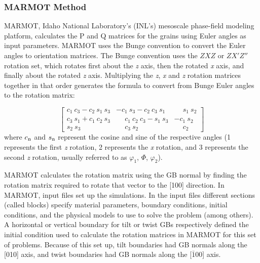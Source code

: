 \documentclass[twoside,senior]{BYUPhys}
\begin{document}
\subsubsection{MARMOT Method\label{PQ:MARMOT}}
MARMOT, Idaho National Laboratory's (INL's) mesoscale phase-field modeling platform,\cite{tonks2012} calculates the P and Q matrices for the grains using Euler angles as input parameters.  MARMOT uses the Bunge convention to convert the Euler angles to orientation matrices.  The Bunge convention uses the $ZXZ$ or $ZX'Z''$ rotation set, which rotates first about the \emph{z} axis, then the rotated \emph{x} axis, and finally about the rotated \emph{z} axis.  Multiplying the \emph{z}, \emph{x} and \emph{z} rotation matrices together in that order generates the formula to convert from Bunge Euler angles to the rotation matrix:

\begin{equation}
\label{eq:bungeMat}
\left[
\begin{array}{ccc}
c_1\ c_3 - c_2\ s_1\ s_3 & -c_1\ s_3 - c_2\ c_3\ s_1 & \phantom{-}s_1\ s_2 \\
c_3\ s_1 + c_1\ c_2\ s_3 & \phantom{-}c_1\ c_2\ c_3 - s_1\ s_3 & -c_1\ s_2 \\
s_2\ s_3 & \phantom{-}c_3\ s_2 & \phantom{-}c_2 
\end{array}
\right]
\end{equation}
where $c_\textnormal{n}$ and $s_\textnormal{n}$ represent the cosine and sine of the respective angles (1 represents the first \emph{z} rotation, 2 represents the \emph{x} rotation, and 3 represents the second \emph{z} rotation, usually referred to as\cite{randle2000} $\varphi_1$, $\Phi$, $\varphi_2$).

MARMOT calculates the rotation matrix using the GB normal by finding the rotation matrix required to rotate that vector to the [100] direction.  In MARMOT, input files set up the simulations.  In the input files different sections (called blocks) specify material parameters, boundary conditions, initial conditions, and the physical models to use to solve the problem (among others).  A horizontal or vertical boundary for tilt or twist GBs respectively defined the initial condition used to calculate the rotation matrices in MARMOT for this set of problems.  Because of this set up, tilt boundaries had GB normals along the [010] axis, and twist boundaries had GB normals along the [$\bar{1}$00] axis.
\end{document}
